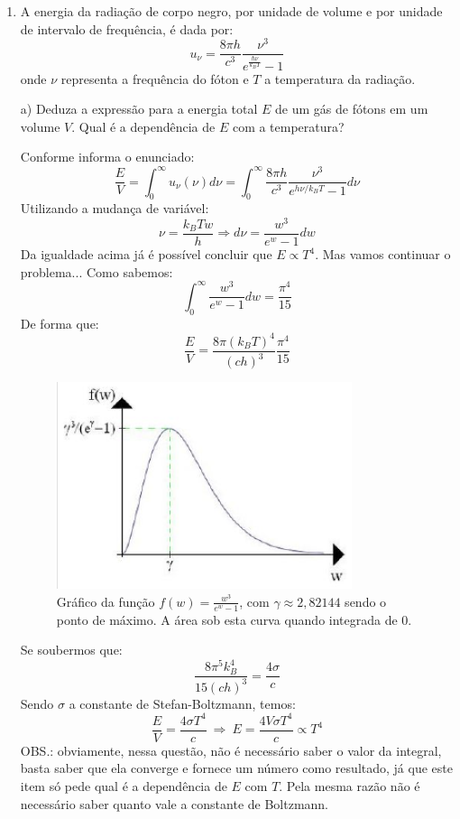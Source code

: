 \begin{enumerate}[start=1,label={\bfseries Q\arabic*.}]
\item A energia da radiação de corpo negro, por unidade de volume e por unidade de intervalo de frequência, é dada por:
$$ u_{\nu} = \frac{8 \pi h}{c^{3}} \frac{\nu^{3}}{e^{\frac{\hbar \nu}{k_{B} T}} - 1} $$
onde $\nu$ representa a frequência do fóton e $T$ a temperatura da radiação.

a) Deduza a expressão para a energia total $E$ de um gás de fótons em um volume $V$. Qual é a dependência de $E$ com a temperatura?

\resposta Conforme informa o enunciado:
$$
\frac{E}{V} = \int_{0}^{\infty} u_{\nu} (\nu) d \nu = \int_{0}^{\infty} \frac{8\pi h}{c^{3}} \frac{\nu^{3}}{e^{h \nu / k_{B} T} - 1} d\nu
$$
Utilizando a mudança de variável:
$$
\nu = \frac{k_{B} T w}{h} \Rightarrow d \nu = \frac{w^{3}}{e^{w}-1} dw
$$
Da igualdade acima já é possível concluir que $E \propto T^{4} $. Mas vamos continuar o problema... Como sabemos:
$$
\int_{0}^{\infty} \frac{w^{3}}{e^{w}-1} dw = \frac{\pi^{4}}{15}
$$
De forma que:
$$
\frac{E}{V} = \frac{8 \pi (k_{B} T)^{4}}{(ch)^{3}} \frac{\pi^{4}}{15}
$$

\begin{figure}
  \centering
  \includegraphics[scale=0.8]{moderna-img/funcao}
  \caption{Gráfico da função $f(w) = \frac{w^{3}}{e^{w}-1}$, com $\gamma \approx 2,82144$ sendo o ponto de máximo. A área sob esta curva quando integrada de 0.}
\end{figure}
Se soubermos que:
$$
\frac{8 \pi^{5}k_{B}^{4} }{15(ch)^{3}} = \frac{4 \sigma}{c}
$$
Sendo $\sigma$ a constante de Stefan-Boltzmann, temos:
$$
\frac{E}{V} = \frac{4 \sigma T^{4}}{c} \ \Rightarrow \ E = \frac{4 V \sigma T^{4}}{c} \propto T^{4}
$$
OBS.: obviamente, nessa questão, não é necessário saber o valor da integral, basta saber que ela converge e fornece um número como resultado, já que este item só pede qual é a dependência de $E$ com $T$. Pela mesma razão não é necessário saber quanto vale a constante de Boltzmann.



\end{enumerate}
